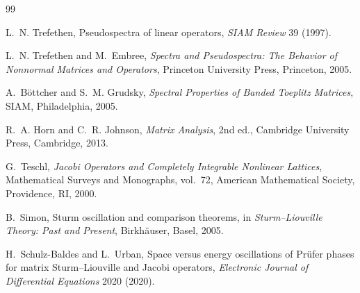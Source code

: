 \documentclass[11pt]{amsart}
\numberwithin{equation}{section}
\begin{document}
\begin{thebibliography}{99}

L.~N. Trefethen,
Pseudospectra of linear operators,
\emph{SIAM Review} 39 (1997).

L.~N. Trefethen and M.~Embree,
\emph{Spectra and Pseudospectra: The Behavior of Nonnormal Matrices and Operators},
Princeton University Press, Princeton, 2005.

A.~B\"ottcher and S.~M. Grudsky,
\emph{Spectral Properties of Banded Toeplitz Matrices},
SIAM, Philadelphia, 2005.

R.~A. Horn and C.~R. Johnson,
\emph{Matrix Analysis},
2nd ed.,
Cambridge University Press, Cambridge, 2013.

G.~Teschl,
\emph{Jacobi Operators and Completely Integrable Nonlinear Lattices},
Mathematical Surveys and Monographs, vol.~72,
American Mathematical Society, Providence, RI, 2000.

B.~Simon,
Sturm oscillation and comparison theorems,
in \emph{Sturm--Liouville Theory: Past and Present},
Birkh\"auser, Basel, 2005.

H.~Schulz-Baldes and L.~Urban,
Space versus energy oscillations of Pr\"ufer phases for matrix Sturm--Liouville and Jacobi operators,
\emph{Electronic Journal of Differential Equations} 2020 (2020).

\end{thebibliography}
\end{document}
